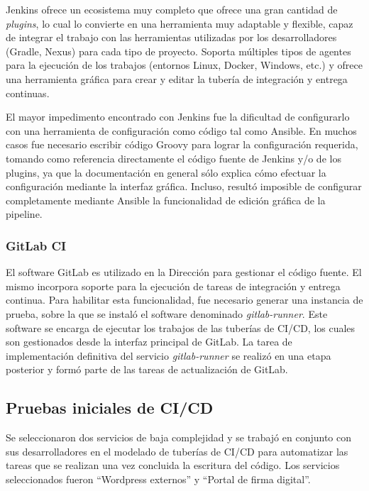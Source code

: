 Jenkins ofrece un ecosistema muy completo que ofrece una gran cantidad de \textit{plugins}, lo cual lo convierte en una herramienta muy adaptable y flexible, capaz de integrar el trabajo con las herramientas utilizadas por los desarrolladores (Gradle, Nexus) para cada tipo de proyecto. Soporta múltiples tipos de agentes para la ejecución de los trabajos (entornos Linux, Docker, Windows, etc.) y ofrece una herramienta gráfica para crear y editar la tubería de integración y entrega continuas.

El mayor impedimento encontrado con Jenkins fue la dificultad de configurarlo con una herramienta de configuración como código tal como Ansible. En muchos casos fue necesario escribir código Groovy para lograr la configuración requerida, tomando como referencia directamente el código fuente de Jenkins y/o de los plugins, ya que la documentación en general sólo explica cómo efectuar la configuración mediante la interfaz gráfica. Incluso, resultó imposible de configurar completamente mediante Ansible la funcionalidad de edición gráfica de la pipeline.

\subsubsection{GitLab CI}

El software GitLab es utilizado en la Dirección para gestionar el código fuente. El mismo incorpora soporte para la ejecución de tareas de integración y entrega continua. Para habilitar esta funcionalidad, fue necesario generar una instancia de prueba, sobre la que se instaló el software denominado \textit{gitlab-runner}. Este software se encarga de ejecutar los trabajos de las tuberías de CI/CD, los cuales son gestionados desde la interfaz principal de GitLab. La tarea de implementación definitiva del servicio \textit{gitlab-runner} se realizó en una etapa posterior y formó parte de las tareas de actualización de GitLab.

\subsection{Pruebas iniciales de CI/CD}

Se seleccionaron dos servicios de baja complejidad y se trabajó en conjunto con sus desarrolladores en el modelado de tuberías de CI/CD para automatizar las tareas que se realizan una vez concluida la escritura del código. Los servicios seleccionados fueron “Wordpress externos” y “Portal de firma digital”.


